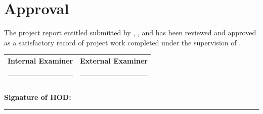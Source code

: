 \chapter*{Approval}

The project report entitled \textbf{\thesistitle} submitted by \textbf{\studentone}, \textbf{\studenttwo}, and \textbf{\studentthree} has been reviewed and approved as a satisfactory record of project work completed under the supervision of \textbf{\guidefaculty}.

\vspace{1.5cm}

\noindent
\begin{tabular}{p{}p{}}
\textbf{Internal Examiner} & \textbf{External Examiner} \\[1.5cm]
\rule{5cm}{0.4pt} & \rule{5cm}{0.4pt}
\end{tabular}

\vspace{2cm}

\noindent
\textbf{Signature of HOD:} \rule{5cm}{0.4pt}

\clearpage
